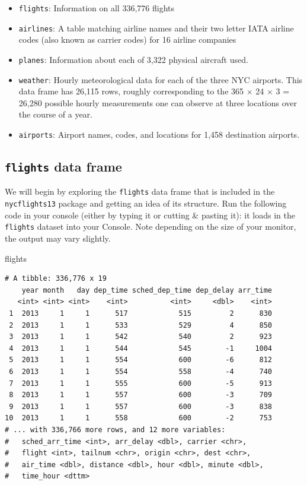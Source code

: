 \documentclass[12pt, krantz2,]{krantz}
\makeatletter
\newenvironment{Shaded}{\begin{snugshade}}{\end{snugshade}}
\newcommand{\NormalTok}[1]{#1}
\providecommand{\tightlist}{%
  \setlength{\itemsep}{0pt}\setlength{\parskip}{0pt}}
\newenvironment{kframe}{%
\medskip{}
\setlength{\fboxsep}{.8em}
 \def\at@end@of@kframe{}%
 \ifinner\ifhmode%
  \def\at@end@of@kframe{\end{minipage}}%
  \begin{minipage}{\columnwidth}%
 \fi\fi%
 \def\FrameCommand##1{\hskip\@totalleftmargin \hskip-\fboxsep
 \colorbox{shadecolor}{##1}\hskip-\fboxsep
     \hskip-\linewidth \hskip-\@totalleftmargin \hskip\columnwidth}%
 \MakeFramed {\advance\hsize-\width
   \@totalleftmargin\z@ \linewidth\hsize
   \@setminipage}}%
 {\par\unskip\endMakeFramed%
 \at@end@of@kframe}
\renewenvironment{Shaded}{\begin{kframe}}{\end{kframe}}
\makeatother
\begin{document}
\begin{itemize}
\tightlist
\item
  \texttt{flights}: Information on all 336,776 flights
\item
  \texttt{airlines}: A table matching airline names and their two letter IATA airline codes (also known as carrier codes) for 16 airline companies
\item
  \texttt{planes}: Information about each of 3,322 physical aircraft used.
\item
  \texttt{weather}: Hourly meteorological data for each of the three NYC airports. This data frame has 26,115 rows, roughly corresponding to the 365 \(\times\) 24 \(\times\) 3 = 26,280 possible hourly measurements one can observe at three locations over the course of a year.
\item
  \texttt{airports}: Airport names, codes, and locations for 1,458 destination airports.
\end{itemize}

\hypertarget{flights-data-frame}{%
\subsection{\texorpdfstring{\texttt{flights} data frame}{flights data frame}}\label{flights-data-frame}}

We will begin by exploring the \texttt{flights} data frame that is included in the \texttt{nycflights13} package and getting an idea of its structure. Run the following code in your console (either by typing it or cutting \& pasting it): it loads in the \texttt{flights} dataset into your Console. Note depending on the size of your monitor, the output may vary slightly.

\begin{Shaded}
\begin{Highlighting}[]
\NormalTok{flights}
\end{Highlighting}
\end{Shaded}

\begin{verbatim}
# A tibble: 336,776 x 19
    year month   day dep_time sched_dep_time dep_delay arr_time
   <int> <int> <int>    <int>          <int>     <dbl>    <int>
 1  2013     1     1      517            515         2      830
 2  2013     1     1      533            529         4      850
 3  2013     1     1      542            540         2      923
 4  2013     1     1      544            545        -1     1004
 5  2013     1     1      554            600        -6      812
 6  2013     1     1      554            558        -4      740
 7  2013     1     1      555            600        -5      913
 8  2013     1     1      557            600        -3      709
 9  2013     1     1      557            600        -3      838
10  2013     1     1      558            600        -2      753
# ... with 336,766 more rows, and 12 more variables:
#   sched_arr_time <int>, arr_delay <dbl>, carrier <chr>,
#   flight <int>, tailnum <chr>, origin <chr>, dest <chr>,
#   air_time <dbl>, distance <dbl>, hour <dbl>, minute <dbl>,
#   time_hour <dttm>
\end{verbatim}
\end{document}
